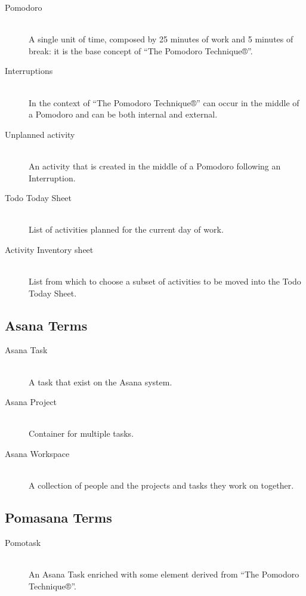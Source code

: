 		\begin{description}

			\item [Pomodoro] \hfill \\
			A single unit of time, composed by 25 minutes of work and 5 minutes of break: it is the base concept of “The Pomodoro Technique®”.

			\item [Interruptions] \hfill \\
			In the context of “The Pomodoro Technique®” can occur in the middle of a Pomodoro and can be both internal and external.

			\item [Unplanned activity] \hfill \\
			An activity that is created in the middle of a Pomodoro following an Interruption.

			\item [Todo Today Sheet] \hfill \\
			List of activities planned for the current day of work.

			\item [Activity Inventory sheet] \hfill \\
			List from which to choose a subset of activities to be moved into the Todo Today Sheet.

		\end{description}

	\subsection{Asana Terms}

		\begin{description}

			\item [Asana Task] \hfill \\
			A task that exist on the Asana system.

			\item [Asana Project] \hfill \\
			Container for multiple tasks.

			\item [Asana Workspace] \hfill \\
			A collection of people and the projects and tasks they work on together.

		\end{description}


	\subsection{Pomasana Terms}
		\begin{description}

			\item [Pomotask] \hfill \\
			An Asana Task enriched with some element derived from “The Pomodoro Technique®”.

		\end{description}


